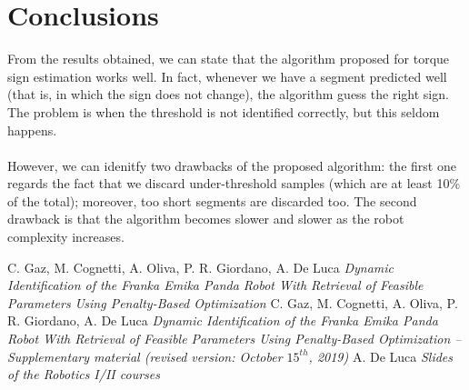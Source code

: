 \documentclass{article}
\begin{document}
\section{Conclusions}
From the results obtained, we can state that the algorithm proposed for torque sign estimation works well. In fact, whenever we have a segment predicted well (that is, in which the sign does not change), the algorithm guess the right  sign. The problem is when the threshold is not identified correctly, but this seldom happens. \\\\

However, we can idenitfy two drawbacks of the proposed algorithm: the first one regards the fact that we discard under-threshold samples (which are at least 10\% of the total); moreover, too short segments are discarded too. The second drawback is that the algorithm becomes slower and slower as the robot complexity increases.
\clearpage

\begin{thebibliography}{}
C. Gaz, M. Cognetti, A. Oliva, P. R. Giordano, A. De Luca
\emph {Dynamic Identification of the Franka Emika Panda Robot With Retrieval of Feasible Parameters Using Penalty-Based Optimization}
C. Gaz, M. Cognetti, A. Oliva, P. R. Giordano, A. De Luca
\emph {Dynamic Identification of the Franka Emika Panda Robot With Retrieval of Feasible Parameters Using Penalty-Based Optimization – Supplementary material (revised version: October $15^{th}$, 2019)}
A. De Luca
\emph {Slides of the Robotics I/II courses}
\end{thebibliography}
\end{document}
